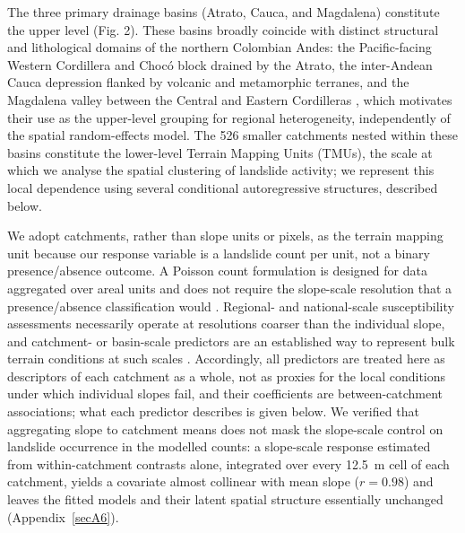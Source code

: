 \documentclass[journal abbreviation, manuscript]{copernicus}
\newcommand{\hl}[1]{#1}
\newcommand{\hlE}[1]{#1}
\begin{document}
\hl{The three primary drainage basins (Atrato, Cauca, and Magdalena) constitute the upper level (Fig. 2). 
These basins broadly coincide with distinct structural and lithological domains of the northern Colombian Andes: the Pacific-facing Western Cordillera and Choc\'{o} block drained by the Atrato, the inter-Andean Cauca depression flanked by volcanic and metamorphic terranes, and the Magdalena valley between the Central and Eastern Cordilleras }\citep{Cediel2003, Taboada2000}\hl{, which motivates their use as the upper-level grouping for regional heterogeneity, independently of the spatial random-effects model. 
The 526 smaller catchments nested within these basins constitute the lower-level Terrain Mapping Units (TMUs), the scale} \hlE{at which we analyse the spatial clustering of landslide activity;} \hl{we represent this local dependence using several conditional autoregressive structures, described below.}

\hl{We adopt catchments, rather than slope units or pixels, as the terrain mapping unit because our response variable is a landslide count per unit, not a binary presence/absence outcome. 
A Poisson count formulation is designed for data aggregated over areal units and does not require the slope-scale resolution that a presence/absence classification would }\citep{lombardo2020space}\hl{. 
Regional- and national-scale susceptibility assessments necessarily operate at resolutions coarser than the individual slope, and catchment- or basin-scale predictors are an established way to represent bulk terrain conditions at such scales }\citep{guzzetti2005probabilistic, stanley2017heuristic, nowickijessee2018global}\hlE{. 
Accordingly, all predictors are treated here as descriptors of each catchment as a whole, not as proxies for the local conditions under which individual slopes fail, and their coefficients are between-catchment associations; what each predictor describes is given below. We verified that aggregating slope to catchment means does not mask the slope-scale control on landslide occurrence in the modelled counts: a slope-scale response estimated from within-catchment contrasts alone, integrated over every 12.5~m cell of each catchment, yields a covariate almost collinear with mean slope ($r = 0.98$) and leaves the fitted models and their latent spatial structure essentially unchanged (\mbox{Appendix~\ref{secA6}}).}
\end{document}
